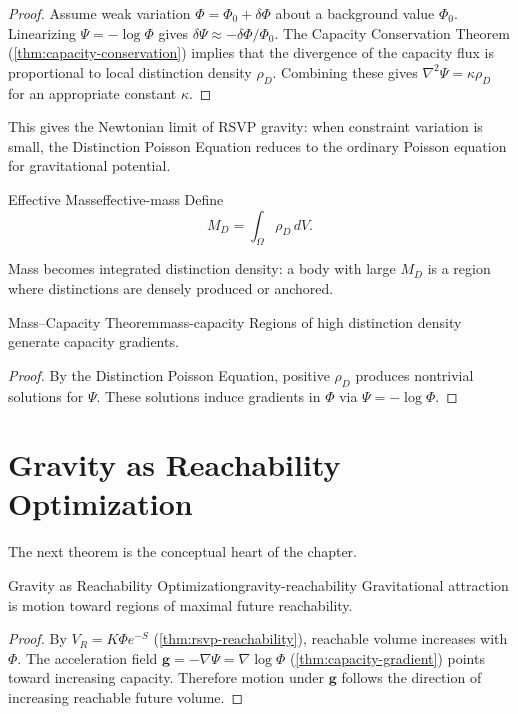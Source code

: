 \documentclass[12pt,twoside,openright]{book}
\begin{document}
\begin{proof}
  Assume weak variation $\Phi = \Phi_0 + \delta\Phi$ about
  a background value $\Phi_0$. Linearizing
  $\Psi = -\log\Phi$ gives $\delta\Psi \approx
  -\delta\Phi/\Phi_0$. The Capacity Conservation Theorem
  (\cref{thm:capacity-conservation}) implies that the
  divergence of the capacity flux is proportional to local
  distinction density $\rho_D$. Combining these gives
  $\nabla^2\Psi = \kappa\rho_D$ for an appropriate constant
  $\kappa$.
\end{proof}

This gives the Newtonian limit of RSVP gravity: when
constraint variation is small, the Distinction Poisson
Equation reduces to the ordinary Poisson equation for
gravitational potential.

\begin{definition}{Effective Mass}{effective-mass}
  Define
  \[
    M_D = \int_\Omega \rho_D \, dV.
  \]
\end{definition}

Mass becomes integrated distinction density: a body with
large $M_D$ is a region where distinctions are densely
produced or anchored.

\begin{theorem}{Mass--Capacity Theorem}{mass-capacity}
  Regions of high distinction density generate capacity
  gradients.
\end{theorem}

\begin{proof}
  By the Distinction Poisson Equation, positive $\rho_D$
  produces nontrivial solutions for $\Psi$. These solutions
  induce gradients in $\Phi$ via $\Psi = -\log\Phi$.
\end{proof}

\section{Gravity as Reachability Optimization}
\label{sec:ch17-optimization}

The next theorem is the conceptual heart of the chapter.

\begin{theorem}{Gravity as Reachability Optimization}{gravity-reachability}
  Gravitational attraction is motion toward regions of
  maximal future reachability.
\end{theorem}

\begin{proof}
  By $V_R = K\Phi e^{-S}$ (\cref{thm:rsvp-reachability}),
  reachable volume increases with $\Phi$. The acceleration
  field $\mathbf{g} = -\nabla\Psi = \nabla\log\Phi$
  (\cref{thm:capacity-gradient}) points toward increasing
  capacity. Therefore motion under $\mathbf{g}$ follows the
  direction of increasing reachable future volume.
\end{proof}
\end{document}
